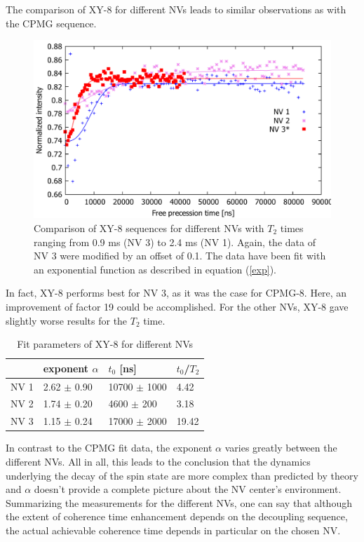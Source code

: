 \documentclass[12pt,a4paper]{article}
\begin{document}
The comparison of XY-8 for different NVs leads to similar observations as with the CPMG sequence.\\
\begin{figure}[H] 
\includegraphics[scale=0.6]{xv.pdf} 
\caption{Comparison of XY-8 sequences for different NVs with $T_2$ times ranging from 0.9 ms (NV 3) to 2.4 ms (NV 1). Again, the data of NV 3 were modified by an offset of 0.1. The data have been fit with an exponential function as described in equation (\ref{exp}).}
\label{X8}
\end{figure}
In fact, XY-8 performs best for NV 3, as it was the case for CPMG-8. Here, an improvement of factor 19 could be accomplished. For the other NVs, XY-8 gave slightly worse results for the $T_2$ time.\\
\begin{table}[H]
\centering
\caption{Fit parameters of XY-8 for different NVs}
\label{X8t}
\begin{tabular}{l|ll|l}
& exponent $\alpha$ & $t_0$ {[}ns{]}                                              & $t_0$/$T_2$              \\\hline
NV 1            & 2.62         $\pm$ 0.90 & 10700         $\pm$ 1000         & 4.42 \\
NV 2            & 1.74         $\pm$ 0.20 & 4600         $\pm$ 200        & 3.18 \\
NV 3            & 1.15          $\pm$ 0.24 & 17000        $\pm$ 2000         & 19.42
\end{tabular}
\end{table}
In contrast to the CPMG fit data, the exponent $\alpha$ varies greatly between the different NVs.
All in all, this leads to the conclusion that the dynamics underlying the decay of the spin state are more complex than predicted by theory and $\alpha$ doesn't provide a complete picture about the NV center's environment.\\
Summarizing the measurements for the different NVs, one can say that although the extent of coherence time enhancement depends on the decoupling sequence, the actual achievable coherence time depends in particular on the chosen NV.
\end{document}

